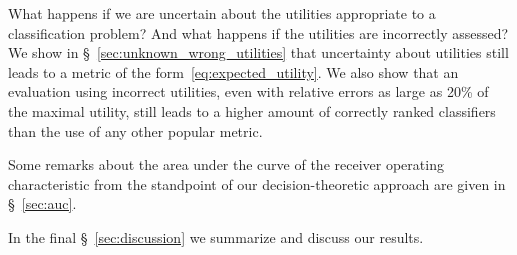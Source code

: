 \documentclass[\ifafour a4paper,12pt,\else a5paper,10pt,\fi%
onecolumn,oneside,article,%
british%
]{memoir}
\theoremstyle{remark}
\theoremstyle{innote}
\newcommand*{\wrench}{{\fontencoding{U}\fontfamily{fontawesomethree}\selectfont\symbol{114}}}
\newcommand{\mynotew}[1]{{\footnotesize\color{notecolour}\wrench\ #1}}
\renewcommand*{\|}[1][]{\nonscript\:#1\vert\nonscript\:\mathopen{}}
\newcommand*{\sect}{\S}%
\begin{document}
What happens if we are uncertain about the utilities appropriate to a classification problem? And what happens if the utilities are incorrectly assessed? We show in \sect~\ref{sec:unknown_wrong_utilities} that uncertainty about utilities still leads to a metric of the form~\eqref{eq:expected_utility}. We also show that an evaluation using incorrect utilities, even with relative errors as large as 20\% of the maximal utility, still leads to a higher amount of correctly ranked classifiers than the use of any other popular metric.

Some remarks about the area under the curve of the receiver operating characteristic from the standpoint of our decision-theoretic approach are given in \sect~\ref{sec:auc}.

In the final \sect~\ref{sec:discussion} we summarize and discuss our results.



\end{document}
